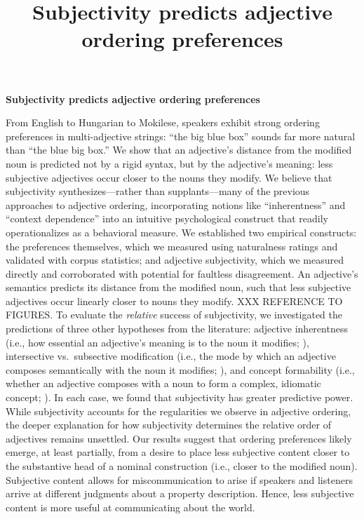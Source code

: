 \documentclass[10pt]{article}
\title{Subjectivity predicts adjective ordering preferences}
\begin{document}

\begin{center}
	\textbf{Subjectivity predicts adjective ordering preferences}
\end{center}
From English to Hungarian to Mokilese, speakers exhibit strong ordering preferences in multi-adjective strings: ``the big blue box'' sounds far more natural than ``the blue big box.'' We show that an adjective's distance from the modified noun is predicted not by a rigid syntax, but by the adjective's meaning: less subjective adjectives occur closer to the nouns they modify.  
We believe that subjectivity synthesizes---rather than supplants---many of the previous approaches to adjective ordering, incorporating notions like ``inherentness'' and ``context dependence'' into an intuitive psychological construct that readily operationalizes as a behavioral measure. 
	We established two empirical constructs: the preferences themselves, which we measured using naturalness ratings and validated with corpus statistics; and adjective subjectivity, which we measured directly and corroborated with potential for faultless disagreement. 
An adjective's semantics predicts its distance from the modified noun, such that less subjective adjectives occur linearly closer to nouns they modify. XXX REFERENCE TO FIGURES.
To evaluate the \emph{relative} success of subjectivity, we investigated the predictions of three other hypotheses from the literature: adjective inherentness (i.e., how essential an adjective's meaning is to the noun it modifies; \citealp{sweet1898,whorf1945}), intersective vs.~subsective modification (i.e., the mode by which an adjective composes semantically with the noun it modifies; \citealp{truswell2009}), and concept formability (i.e., whether an adjective composes with a noun to form a complex, idiomatic concept; \citealp{McNally2004,bouchard2005,svenonius2008}). In each case, we found that subjectivity has greater predictive power.
	While subjectivity accounts for the regularities we observe in adjective ordering, the deeper explanation for how subjectivity determines the relative order of adjectives remains unsettled. Our results suggest that ordering preferences likely emerge, at least partially, from a desire to place less subjective content closer to the substantive head of a nominal construction (i.e., closer to the modified noun). 
Subjective content allows for miscommunication to arise if speakers and listeners arrive at different judgments about a property description. Hence, less subjective content is more useful at communicating about the world. 
\end{document}
